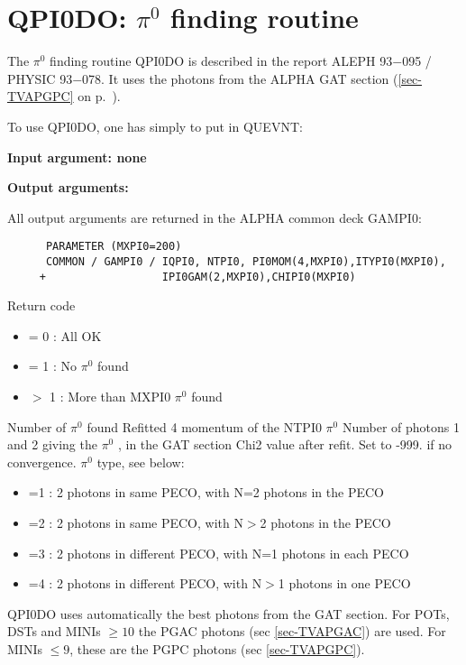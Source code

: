 \section{\label{sec-OARQPI0}QPI0DO: $\pi^0$ finding routine}
\par
The $\pi^0$ finding routine QPI0DO
is described in the report ALEPH 93$-$095 / PHYSIC 93$-$078.
It uses the photons from the ALPHA GAT section
(\ref{sec-TVAPGPC} on p.~\pageref{sec-TVAPGPC}).
 
\par
To use QPI0DO, one has simply to put in QUEVNT:
\par
{}
\par
{\bf Input argument: none}
\par
{\bf Output arguments:}
\par
      All output arguments are returned in the ALPHA common deck GAMPI0:
\begin{verbatim}
      PARAMETER (MXPI0=200)
      COMMON / GAMPI0 / IQPI0, NTPI0, PI0MOM(4,MXPI0),ITYPI0(MXPI0),
     +                  IPI0GAM(2,MXPI0),CHIPI0(MXPI0)
\end{verbatim}
\begin{indentlist}{ 3.50cm}{ 3.75cm}
Return code
\begin{itemize}
\item  = 0  : All OK
\item  = 1  : No $\pi^0$ found
\item  $>$ 1  :    More than MXPI0 $\pi^0$ found
\end{itemize}
                          Number of $\pi^0$  found
                     Refitted 4 momentum of the NTPI0  $\pi^0$
                    Number of photons 1 and 2 giving the $\pi^0$ , in the GAT section
                    Chi2 value after refit. Set to -999. if no convergence.
                    $\pi^0$ type, see below:
\begin{itemize}
\item =1 : 2 photons in same PECO, with N=2 photons in the PECO
\item =2 : 2 photons in same PECO, with N$>$2 photons in the PECO
\item =3 : 2 photons in different PECO, with N=1 photons in each PECO
\item =4 : 2 photons in different PECO, with N$>$1 photons in one PECO
\end{itemize}
 
\end{indentlist}
\par
 QPI0DO uses automatically the best photons from the GAT section.
 For POTs, DSTs and MINIs $\geq 10$  the PGAC photons (sec \ref{sec-TVAPGAC}) are used.
 For MINIs $\leq 9$, these are the PGPC photons (sec \ref{sec-TVAPGPC}).
 
